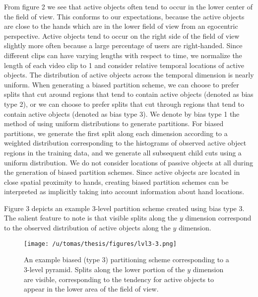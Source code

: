 \documentclass[10pt,twocolumn,letterpaper]{article}
\begin{document}
	From figure 2 we see that active objects often tend to occur in the lower center
	of the field of view. This conforms to our expectations, because
	the active objects are close to the hands which are in the lower field of
	view from an egocentric perspective. Active objects tend to occur on the
  right side of the field of view slightly more often because a large
  percentage of users are right-handed. Since different clips can have
  varying lengths with respect to time, we normalize the length of each
  video clip to 1 and consider relative temporal locations of active
  objects. The distribution of active objects
  across the temporal dimension is nearly uniform. When generating a biased
	partition scheme, we can choose to prefer splits that cut around regions that tend to
	contain active objects (denoted as bias type 2), or we can choose to prefer 
	splits that cut through regions that tend to contain active objects (denoted as bias type 3). 
	We denote by bias type 1 the method of using uniform
	distributions to generate partitions. For biased partitions, we generate
  the first split along each dimension according to a weighted distribution
  corresponding to the histograms of observed active object regions in the training data,
  and we generate all subsequent child cuts using a uniform distribution.
  We do not consider locations of passive objects at all during the
  generation of biased partition schemes. Since active objects are located
  in close spatial proximity to hands, creating biased partition schemes can
  be interpreted as implicitly taking into account information about hand
  locations.
  
  Figure 3 depicts an example 3-level partition scheme created using bias
  type 3. The salient feature to note is that visible splits along the $y$
  dimension correspond to the observed distribution of active objects along
  the $y$ dimension.
  

  \begin{figure}[t]
    \begin{center}
		 \texttt{[image: /u/tomas/thesis/figures/lvl3-3.png]}
    \end{center}
		   \caption{An example biased (type 3) partitioning scheme corresponding to a 3-level
       pyramid. Splits along the lower portion of the $y$ dimension are
     visible, corresponding to the tendency for active objects to appear in
   the lower area of the field of view.}
			\label{fig:long}
			\label{fig:onecol}
  \end{figure}
	
\end{document}
